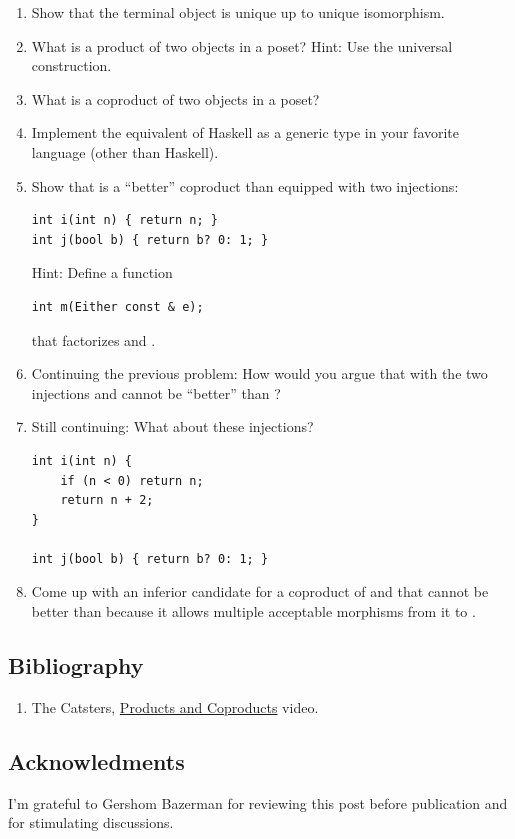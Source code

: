 \begin{enumerate}
  \tightlist
\item
  Show that the terminal object is unique up to unique isomorphism.
\item
  What is a product of two objects in a poset? Hint: Use the universal
  construction.
\item
  What is a coproduct of two objects in a poset?
\item
  Implement the equivalent of Haskell  as a generic type
  in your favorite language (other than Haskell).
\item
  Show that  is a ``better'' coproduct than 
  equipped with two injections:

\begin{verbatim}
int i(int n) { return n; }
int j(bool b) { return b? 0: 1; }
\end{verbatim}

  Hint: Define a function

\begin{verbatim}
int m(Either const & e);
\end{verbatim}

  that factorizes  and .
\item
  Continuing the previous problem: How would you argue that 
  with the two injections  and  cannot be ``better''
  than ?
\item
  Still continuing: What about these injections?

\begin{verbatim}
int i(int n) { 
    if (n < 0) return n;
    return n + 2;
}

int j(bool b) { return b? 0: 1; }
\end{verbatim}
\item
  Come up with an inferior candidate for a coproduct of  and
   that cannot be better than  because it
  allows multiple acceptable morphisms from it to .
\end{enumerate}

\subsection{Bibliography}\label{bibliography}

\begin{enumerate}
\tightlist
\item
  The Catsters,
  \href{https://www.youtube.com/watch?v=upCSDIO9pjc}{Products and
  Coproducts} video.
\end{enumerate}

\subsection{Acknowledments}\label{acknowledments}

I'm grateful to Gershom Bazerman for reviewing this post before
publication and for stimulating discussions.